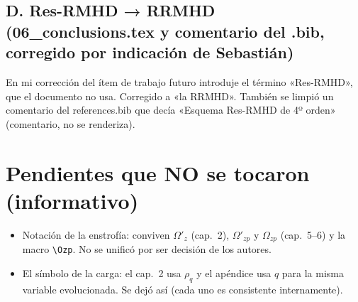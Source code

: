 \documentclass[11pt,a4paper]{article}
\begin{document}
\subsection*{D. Res-RMHD → RRMHD (06\_conclusions.tex y comentario del .bib, corregido por indicación de Sebastián)}
En mi corrección del ítem de trabajo futuro introduje el término «Res-RMHD», que el documento no usa. Corregido a «la RRMHD». También se limpió un comentario del references.bib que decía «Esquema Res-RMHD de 4º orden» (comentario, no se renderiza).

\section*{Pendientes que NO se tocaron (informativo)}
\begin{itemize}
\item Notación de la enstrofía: conviven $\Omega'_z$ (cap.~2), $\Omega'_{zp}$ y $\Omega_{zp}$ (cap.~5--6) y la macro \texttt{\textbackslash Ozp}. No se unificó por ser decisión de los autores.
\item El símbolo de la carga: el cap.~2 usa $\rho_q$ y el apéndice usa $q$ para la misma variable evolucionada. Se dejó así (cada uno es consistente internamente).
\end{itemize}
\end{document}
